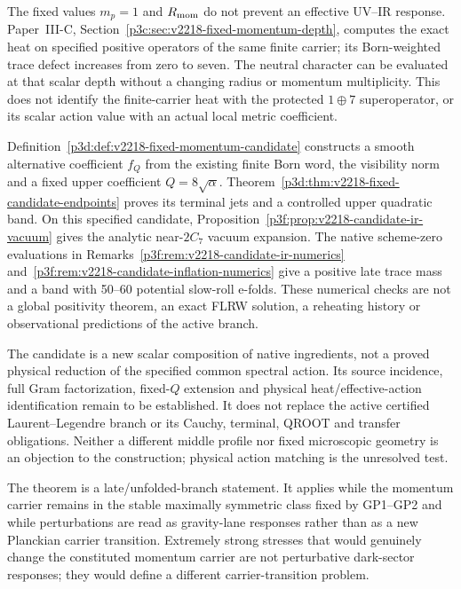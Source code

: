 \documentclass[12pt,a4paper]{article}
\begin{document}
\begin{remark}
\label{p8:rem:v2218-fixed-momentum-interpolation}
The fixed values $m_p=1$ and $R_{\rm mom}$ do not prevent an effective
UV--IR response. Paper~III-C, Section~\ref{p3c:sec:v2218-fixed-momentum-depth},
computes the exact heat on specified positive operators of the same finite
carrier; its Born-weighted trace defect increases from zero to seven.
The neutral character can be evaluated at that scalar depth without a
changing radius or momentum multiplicity. This does not identify the
finite-carrier heat with the protected $1\oplus7$ superoperator, or its
scalar action value with an actual local metric coefficient.

Definition~\ref{p3d:def:v2218-fixed-momentum-candidate} constructs a smooth
alternative coefficient $f_Q$ from the existing finite Born word, the
visibility norm and a fixed upper coefficient $Q=8\sqrt\alpha$.
Theorem~\ref{p3d:thm:v2218-fixed-candidate-endpoints} proves its terminal
jets and a controlled upper quadratic band. On this specified candidate,
Proposition~\ref{p3f:prop:v2218-candidate-ir-vacuum} gives the analytic
near-$2C_7$ vacuum expansion. The native scheme-zero evaluations in
Remarks~\ref{p3f:rem:v2218-candidate-ir-numerics}
and~\ref{p3f:rem:v2218-candidate-inflation-numerics} give a positive late
trace mass and a band with 50--60 potential slow-roll e-folds.
These numerical checks are not a global positivity theorem, an exact
FLRW solution, a reheating history or observational predictions of the
active branch.

The candidate is a new scalar composition of native ingredients, not a
proved physical reduction of the specified common spectral action.
Its source incidence, full Gram factorization, fixed-$Q$ extension and
physical heat/effective-action identification remain to be established.
It does not replace the active certified Laurent--Legendre branch or
its Cauchy, terminal, QROOT and transfer obligations. Neither a different
middle profile nor fixed microscopic geometry is an objection to the
construction; physical action matching is the unresolved test.
\end{remark}

\begin{remark}
\label{p8:rem:scalaron-uniqueness-regime}
The theorem is a late/unfolded-branch statement.  It applies while the momentum
carrier remains in the stable maximally symmetric class fixed by GP1--GP2 and
while perturbations are read as gravity-lane responses rather than as a new
Planckian carrier transition.  Extremely strong stresses that would genuinely
change the constituted momentum carrier are not perturbative dark-sector
responses; they would define a different carrier-transition problem.
\end{remark}
\end{document}
